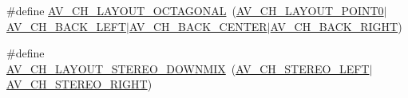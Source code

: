 \begin{DoxyCompactItemize}
\item 
\#define \hyperlink{group__channel__mask__c_gaa760931c084e33a254fca038b7de8dae}{A\+V\+\_\+\+C\+H\+\_\+\+L\+A\+Y\+O\+U\+T\+\_\+\+O\+C\+T\+A\+G\+O\+N\+AL}~(\hyperlink{group__channel__mask__c_ga10eddec555bcf849efce5158b0cbdb50}{A\+V\+\_\+\+C\+H\+\_\+\+L\+A\+Y\+O\+U\+T\+\_\+P\+O\+I\+N\+T0}$\vert$\hyperlink{group__channel__masks_gaa3cae8c6d0eaab3dc3ce178f6af81ae2}{A\+V\+\_\+\+C\+H\+\_\+\+B\+A\+C\+K\+\_\+\+L\+E\+FT}$\vert$\hyperlink{group__channel__masks_ga68650a364e52edb62d5984dddec4f935}{A\+V\+\_\+\+C\+H\+\_\+\+B\+A\+C\+K\+\_\+\+C\+E\+N\+T\+ER}$\vert$\hyperlink{group__channel__masks_ga7a7ab3bb418bf9672dcdf6554346e5eb}{A\+V\+\_\+\+C\+H\+\_\+\+B\+A\+C\+K\+\_\+\+R\+I\+G\+HT})
\item 
\#define \hyperlink{group__channel__mask__c_ga3004e784b29fd907a0d4aebeca0e6933}{A\+V\+\_\+\+C\+H\+\_\+\+L\+A\+Y\+O\+U\+T\+\_\+\+S\+T\+E\+R\+E\+O\+\_\+\+D\+O\+W\+N\+M\+IX}~(\hyperlink{group__channel__masks_gaea8f62dcaa4774307a8fa9b52172c688}{A\+V\+\_\+\+C\+H\+\_\+\+S\+T\+E\+R\+E\+O\+\_\+\+L\+E\+FT}$\vert$\hyperlink{group__channel__masks_gab68e7edb9182b1b22898b960707143c1}{A\+V\+\_\+\+C\+H\+\_\+\+S\+T\+E\+R\+E\+O\+\_\+\+R\+I\+G\+HT})
\end{DoxyCompactItemize}
